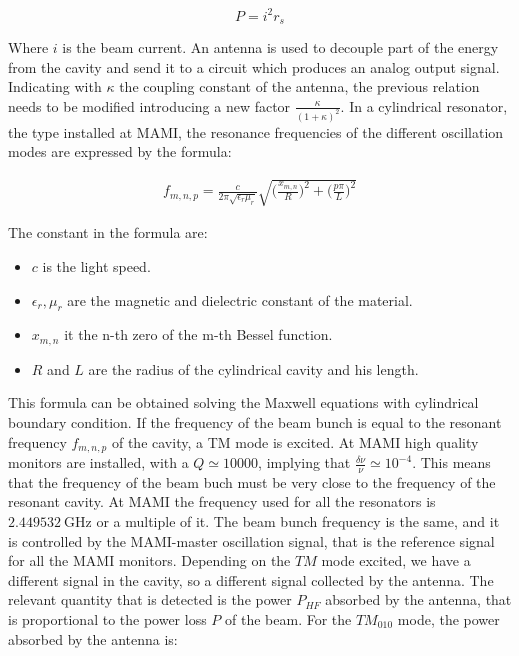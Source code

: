 \begin{equation}
P = i^{2} r_{s}
\end{equation}

Where $i$ is the beam current. An antenna is used to decouple part of the energy from the cavity and send it to a circuit which produces an analog output signal. Indicating with $\kappa$ the coupling constant of the antenna, the previous relation needs to be modified introducing a new factor $ \frac{\kappa}{(1 + \kappa)^2}$. In a cylindrical resonator, the type installed at MAMI, the resonance frequencies of the different oscillation modes are expressed by the formula: 

\begin{align*}
f_{m,n,p} = \frac{c}{2\pi \sqrt{\epsilon_{r} \mu_{r}}} \sqrt{\bigl(\frac{x_{m,n}}{R} \bigl)^{2} + \bigl(\frac{p \pi}{L} \bigl)^{2}}
\end{align*}

The constant in the formula are:

\begin{itemize}
\item $c$ is the light speed.
\item $\epsilon_{r}, \mu_{r}$ are the magnetic and dielectric constant of the material.
\item $x_{m,n}$ it the n-th zero of the m-th Bessel function.
\item $R$ and $L$ are the radius of the cylindrical cavity and his length.
\end{itemize}

This formula can be obtained solving the Maxwell equations with cylindrical boundary condition.
If the frequency of the beam bunch is equal to the resonant frequency $f_{m,n,p}$ of the cavity, a TM mode is excited. At MAMI high quality monitors are installed, with a $Q \simeq 10000$, implying that $\frac{\delta \nu}{\nu} \simeq 10^{-4}$. This means that the frequency of the beam buch must be very close to the frequency of the resonant cavity. At MAMI the frequency used for all the resonators is $\SI{2.449532}{\giga \hertz}$ or a multiple of it. The beam bunch frequency is the same, and it is controlled by the MAMI-master oscillation signal, that is the reference signal for all the MAMI monitors.
Depending on the $TM$ mode excited, we have a different signal in the cavity, so a different signal collected by the antenna. The relevant quantity that is detected is the power $P_{HF}$ absorbed by the antenna, that is proportional to the power loss $P$ of the beam. For the $TM_{010}$ mode, the power absorbed by the antenna is: 

